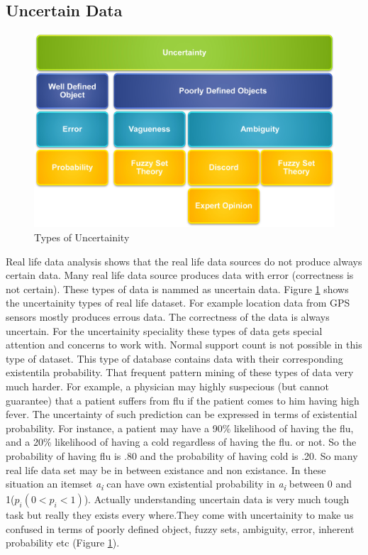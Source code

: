 \subsection{Uncertain Data}
\begin{figure}
\centering
  \includegraphics[width=.9\textwidth]{images/uncertainity_type.jpg}
\caption{Types of Uncertainity}
\label{figure:uncertainity_type}
\end{figure}
Real life data analysis shows that the real life data sources do not produce always certain data. Many real life data source produces data with error (correctness is not certain). These types of data is nammed as uncertain data. Figure \ref{figure:uncertainity_type} shows the uncertainity types of real life dataset. For example location data from GPS sensors mostly produces errous data. The correctness of the data is always uncertain. For the uncertainity speciality these types of data gets special attention and concerns to work with. Normal support count is not possible in this type of dataset. This type of database contains data with their corresponding existentila probability. That frequent pattern mining of these types of data very much harder. For example, a physician may highly suspecious (but cannot guarantee) that a patient suffers from flu if the patient comes to him having high fever. The uncertainty of such prediction can be expressed in terms of existential probability. For instance, a patient may have a 90\% likelihood of having the flu, and a 20\% likelihood of having a cold regardless of having the flu. or not. So the probability of having flu is .80 and the probability of having cold is .20. So many real life data set may be in between existance and non existance. In these situation an itemset \emph{a\textsubscript{i}} can have own existential probability in \emph{a\textsubscript{i}} between 0 and 1($p_i(0<p_i<1)$). Actually understanding uncertain data is very much tough task but really they exists every where.They come with uncertainity to make us confused in terms of poorly defined object, fuzzy sets, ambiguity, error, inherent probability etc (Figure \ref{figure:uncertainity_type}).\\
